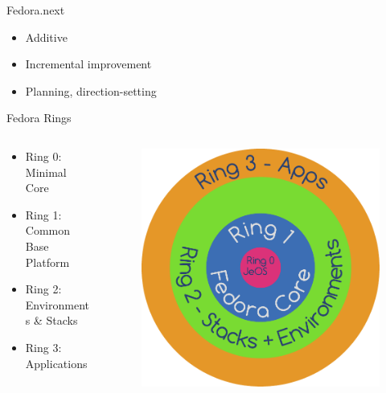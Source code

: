 \documentclass{beamer}
\begin{document}
\begin{frame}{Fedora.next}
  \begin{itemize}
    \item Additive
    \item Incremental improvement
    \item Planning, direction-setting
  \end{itemize}
\end{frame}

\begin{frame}{Fedora Rings}
  \begin{columns}
    \begin{column}{.5\textwidth}
      \begin{itemize}
	\item Ring 0: Minimal Core
	\item Ring 1: Common Base Platform
	\item Ring 2: Environments \& Stacks
	\item Ring 3: Applications
      \end{itemize}
    \end{column}
    \begin{column}{.5\textwidth}
      \begin{figure}[htbp]
        \centering
        \includegraphics[width=.8\textwidth]{fedora-next-ring.pdf}
      \end{figure}
    \end{column}
  \end{columns}
\end{frame}
\end{document}
